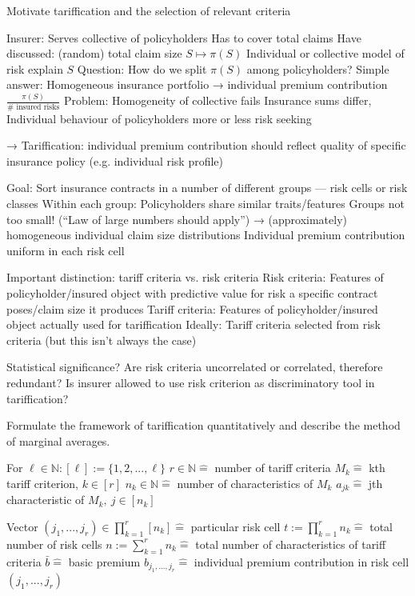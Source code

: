 Motivate tariffication and the selection of relevant criteria

Insurer: Serves collective of policyholders
Has to cover total claims
Have discussed: (random) total claim size \( S \mapsto \pi(S) \)
Individual or collective model of risk explain \( S \)
Question: How do we split \( \pi(S) \) among policyholders?
Simple answer: Homogeneous insurance portfolio → individual premium contribution
\( \frac{\pi(S)}{\text{# insured risks}} \)
Problem: Homogeneity of collective fails
Insurance sums differ, Individual behaviour of policyholders more or less risk seeking

→ Tariffication: individual premium contribution should reflect quality of specific
insurance policy (e.g. individual risk profile)

Goal: Sort insurance contracts in a number of different groups — risk cells or risk classes
Within each group: Policyholders share similar traits/features
Groups not too small! (“Law of large numbers should apply”)
→ (approximately) homogeneous individual claim size distributions
Individual premium contribution uniform in each risk cell

Important distinction:
tariff criteria vs. risk criteria
Risk criteria: Features of policyholder/insured object with predictive value for risk a
specific contract poses/claim size it produces
Tariff criteria: Features of policyholder/insured object actually used for tariffication
Ideally: Tariff criteria selected from risk criteria (but this isn't always the case)

Statistical significance?
Are risk criteria uncorrelated or correlated, therefore redundant?
Is insurer allowed to use risk criterion as discriminatory tool in tariffication?


Formulate the framework of tariffication quantitatively
and describe the method of marginal averages.


For \(\ell \in \mathbb{N}: [\ell] := \{1, 2, ..., \ell\}\)
\(r \in \mathbb{N} \widehat{=}\) number of tariff criteria
\(M_k \widehat{=}\) kth tariff criterion, \(k \in [r]\)
\(n_k \in \mathbb{N} \widehat{=}\) number of characteristics of \(M_k\)
\(a_{jk} \widehat{=}\) jth characteristic of \(M_k,\ j \in [n_k]\)

Vector \((j_1, ..., j_r) \in \prod_{k=1}^r [n_k] \widehat{=}\) particular risk cell
\(t := \prod_{k=1}^r n_k \widehat{=}\) total number of risk cells
\(n := \sum_{k=1}^r n_k \widehat{=}\) total number of characteristics of tariff criteria
\(\bar{b} \widehat{=}\) basic premium
\(b_{j_1, ..., j_r} \widehat{=}\) individual premium contribution in risk cell \((j_1, ..., j_r)\)

